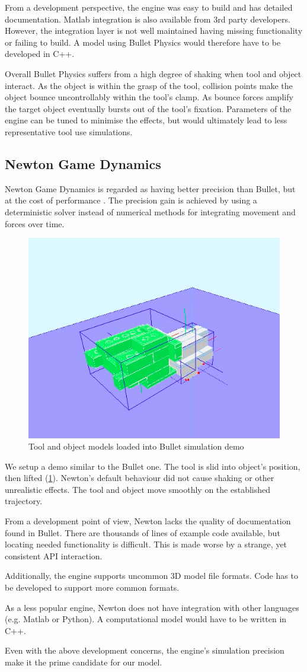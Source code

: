 \documentclass[11]{article}
\begin{document}
From a development perspective, the engine was easy to build and has detailed documentation.
Matlab integration is also available from 3rd party developers. 
However, the integration layer is not well maintained having missing functionality or failing to build.
A model using Bullet Physics would therefore have to be developed in C++. 

Overall Bullet Physics suffers from a high degree of shaking when tool and object interact. 
As the object is within the grasp of the tool, collision points make the object bounce uncontrollably within the tool's clamp. As bounce forces amplify the target object eventually bursts out of the tool's fixation.  
Parameters of the engine can be tuned to minimise the effects, but would ultimately lead to less representative tool use simulations. 

\subsection{Newton Game Dynamics}
Newton Game Dynamics is regarded as having better precision than Bullet, but at the cost of performance \cite{hummel2012}. 
The precision gain is achieved by using a deterministic solver instead of numerical methods for integrating movement and forces over time. 

\begin{figure}[h]
  \centering
  \includegraphics[width=.5\textwidth]{./figures/newton_demo.png}
  \caption{Tool and object models loaded into Bullet simulation demo}
  \label{fig:newton_demo}
\end{figure}      

We setup a demo similar to the Bullet one.
The tool is slid into object's position, then lifted (\ref{fig:newton_demo}). 
Newton's default behaviour did not cause shaking or other unrealistic effects.
The tool and object move smoothly on the established trajectory. 

From a development point of view, Newton lacks the quality of documentation found in Bullet. 
There are thousands of lines of example code available, but locating needed functionality is difficult. 
This is made worse by a strange, yet consistent API interaction.

Additionally, the engine supports uncommon 3D model file formats.
Code has to be developed to support more common formats.

As a less popular engine, Newton does not have integration with other languages (e.g. Matlab or Python). 
A computational model would have to be written in C++.

Even with the above development concerns, the engine's simulation precision make it the prime candidate for our model.  

\printbibliography
\end{document}
